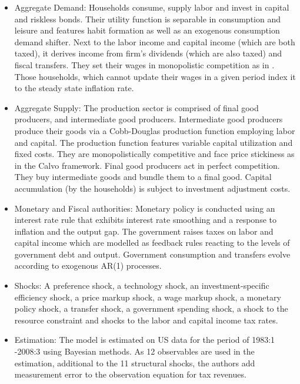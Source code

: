 \documentclass[11pt,a4paper]{article}
\begin{document}
	\begin{itemize}
		
		\item Aggregate Demand: Households consume, supply labor and invest in capital and riskless bonds. Their utility function is separable in consumption and leisure and features habit formation as well as an exogenous consumption demand shifter. Next to the labor income and capital income (which are both taxed), it derives income from firm's dividends (which are also taxed) and fiscal transfers. They set their wages in monopolistic competition as in \cite{ErcegHendersonLevin2000}. Those households, which cannot update their wages in a given period index it to the steady state inflation rate.
		
		\item Aggregate Supply: The production sector is comprised of final good producers, and intermediate good producers. Intermediate good producers produce their goods via a Cobb-Douglas production function employing labor and capital. The production function features variable capital utilization and fixed costs. They are monopolistically competitive and face price stickiness as in the Calvo framework. Final good producers act in perfect competition. They buy intermediate goods and bundle them to a final good. Capital accumulation (by the households) is subject to investment adjustment costs.
		
		\item Monetary and Fiscal authorities: Monetary policy is conducted using an interest rate rule that exhibits interest rate smoothing and a response to inflation and the output gap. The government raises taxes on labor and capital income which are modelled as feedback rules reacting to the levels of government debt and output. Government consumption and transfers evolve according to exogenous AR(1) processes. 
		\item Shocks: A preference shock, a technology shock, an investment-specific efficiency shock, a price markup shock, a wage markup shock, a monetary policy shock, a transfer shock, a government spending shock, a shock to the resource constraint and shocks to the labor and capital income tax rates.
		\item Estimation: The model is estimated on US data for the period of 1983:1 -2008:3 using Bayesian methods. As 12 observables are used in the estimation, additional to the 11 structural shocks, the authors add measurement error to the observation equation for tax revenues. 
		
	\end{itemize}
	
\end{document}
